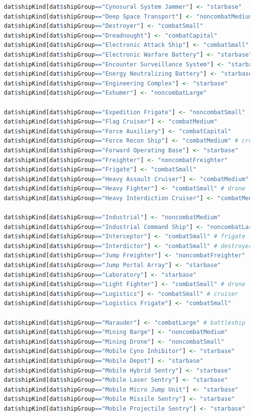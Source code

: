\documentclass[letterpaper,12pt,article]{memoir}
\begin{document}
{\begin{lstlisting}[language=R]
dat$shipKind[dat$shipGroup=="Cynosural System Jammer"] <- "starbase"
dat$shipKind[dat$shipGroup=="Deep Space Transport"] <- "noncombatMedium"
dat$shipKind[dat$shipGroup=="Destroyer"] <- "combatSmall"
dat$shipKind[dat$shipGroup=="Dreadnought"] <- "combatCapital"
dat$shipKind[dat$shipGroup=="Electronic Attack Ship"] <- "combatSmall"
dat$shipKind[dat$shipGroup=="Electronic Warfare Battery"] <- "starbase"
dat$shipKind[dat$shipGroup=="Encounter Surveillance System"] <- "starbase"
dat$shipKind[dat$shipGroup=="Energy Neutralizing Battery"] <- "starbase"
dat$shipKind[dat$shipGroup=="Engineering Complex"] <- "starbase"
dat$shipKind[dat$shipGroup=="Exhumer"] <- "noncombatLarge"

dat$shipKind[dat$shipGroup=="Expedition Frigate"] <- "noncombatSmall"
dat$shipKind[dat$shipGroup=="Flag Cruiser"] <- "combatMedium"
dat$shipKind[dat$shipGroup=="Force Auxiliary"] <- "combatCapital"
dat$shipKind[dat$shipGroup=="Force Recon Ship"] <- "combatMedium" # cruiser
dat$shipKind[dat$shipGroup=="Forward Operating Base"] <- "starbase"
dat$shipKind[dat$shipGroup=="Freighter"] <- "noncombatFreighter"
dat$shipKind[dat$shipGroup=="Frigate"] <- "combatSmall"
dat$shipKind[dat$shipGroup=="Heavy Assault Cruiser"] <- "combatMedium"
dat$shipKind[dat$shipGroup=="Heavy Fighter"] <- "combatSmall" # drone
dat$shipKind[dat$shipGroup=="Heavy Interdiction Cruiser"] <- "combatMedium"

dat$shipKind[dat$shipGroup=="Industrial"] <- "noncombatMedium"
dat$shipKind[dat$shipGroup=="Industrial Command Ship"] <- "noncombatLarge"
dat$shipKind[dat$shipGroup=="Interceptor"] <- "combatSmall" # frigate
dat$shipKind[dat$shipGroup=="Interdictor"] <- "combatSmall" # destroyer
dat$shipKind[dat$shipGroup=="Jump Freighter"] <- "noncombatFreighter"
dat$shipKind[dat$shipGroup=="Jump Portal Array"] <- "starbase"
dat$shipKind[dat$shipGroup=="Laboratory"] <- "starbase"
dat$shipKind[dat$shipGroup=="Light Fighter"] <- "combatSmall" # drone
dat$shipKind[dat$shipGroup=="Logistics"] <- "combatSmall" # cruiser
dat$shipKind[dat$shipGroup=="Logistics Frigate"] <- "combatSmall" 

dat$shipKind[dat$shipGroup=="Marauder"] <- "combatLarge" # battleship
dat$shipKind[dat$shipGroup=="Mining Barge"] <- "noncombatMedium"
dat$shipKind[dat$shipGroup=="Mining Drone"] <- "noncombatSmall"
dat$shipKind[dat$shipGroup=="Mobile Cyno Inhibitor"] <- "starbase"
dat$shipKind[dat$shipGroup=="Mobile Depot"] <- "starbase"
dat$shipKind[dat$shipGroup=="Mobile Hybrid Sentry"] <- "starbase"
dat$shipKind[dat$shipGroup=="Mobile Laser Sentry"] <- "starbase"
dat$shipKind[dat$shipGroup=="Mobile Micro Jump Unit"] <- "starbase"
dat$shipKind[dat$shipGroup=="Mobile Missile Sentry"] <- "starbase"
dat$shipKind[dat$shipGroup=="Mobile Projectile Sentry"] <- "starbase"


\end{lstlisting}}
\end{document}
